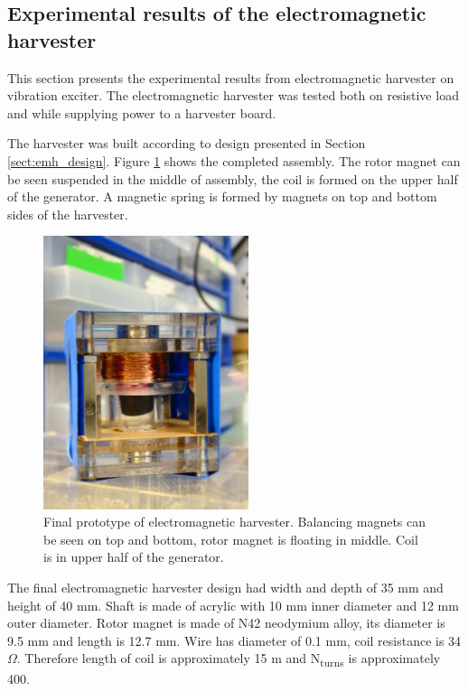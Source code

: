 \subsection{Experimental results of the electromagnetic harvester}
This section presents the experimental results from electromagnetic harvester on vibration exciter. The electromagnetic harvester was tested both on resistive load and while supplying power to a harvester board. 

The harvester was built according to design presented in Section \ref{sect:emh_design}. Figure \ref{fig:emh_final} shows the completed assembly. The rotor magnet can be seen suspended in the middle of assembly, the coil is formed on the upper half of the generator. A magnetic spring is formed by magnets on top and bottom sides of the harvester. 

\begin{figure}[htb]
\begin{center}
\includegraphics[height=8cm]{images/own_pic/inductive_harvester.jpg}
\end{center}
\caption{\label{fig:emh_final} Final prototype of electromagnetic harvester. Balancing magnets can be seen on top and bottom, rotor magnet is floating in middle. Coil is in upper half of the generator.}
\end{figure}

The final electromagnetic harvester design had width and depth of 35 mm and height of 40 mm. Shaft is made of acrylic with 10 mm inner diameter and 12 mm outer diameter. Rotor magnet is made of N42 neodymium alloy, its diameter is 9.5 mm and length is 12.7 mm. Wire has diameter of 0.1 mm, coil resistance is 34 $\Omega$. Therefore length of coil is approximately 15 m and N\textsubscript{turns} is approximately 400. 

